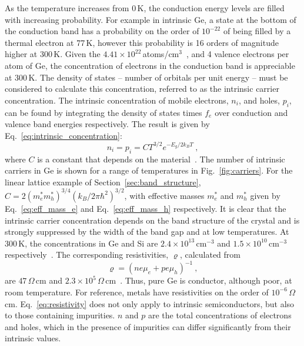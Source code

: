 As the temperature increases from 0\,K, the conduction energy levels are filled with increasing probability. For example in intrinsic Ge, a state at the bottom of the conduction band has a probability on the order of $10^{-22}$ of being filled by a thermal electron at 77\,K, however this probability is 16 orders of magnitude higher at 300\,K. Given the $4.41\times10^{22}$\,atoms/cm$^3$~\cite{knoll}, and 4 valence electrons per atom of Ge, the concentration of electrons in the conduction band is appreciable at 300\,K. The density of states -- number of orbitals per unit energy -- must be considered to calculate this concentration, referred to as the intrinsic carrier concentration. The intrinsic concentration of mobile electrons, $n_i$, and holes, $p_i$, can be found by integrating the density of states times $f_e$ over conduction and valence band energies respectively. The result is given by Eq.~\ref{eq:intrinsic_concentration}:
\begin{equation}
	n_i = p_i = CT^{3/2}e^{-E_g/2k_BT}~,
	\label{eq:intrinsic_concentration}
\end{equation}
where $C$ is a constant that depends on the material~\cite{knoll, kittel}. The number of intrinsic carriers in Ge is shown for a range of temperatures in Fig.~\ref{fig:carriers}. For the linear lattice example of Section~\ref{sec:band_structure}, $C = 2(m_e^*m_h^*)^{3/4}(k_B/2\pi\hbar^2)^{3/2}$, with effective masses $m_e^*$ and $m_h^*$ given by Eq.~\ref{eq:eff_mass_e} and Eq.~\ref{eq:eff_mass_h} respectively. It is clear that the intrinsic carrier concentration depends on the band structure of the crystal and is strongly suppressed by the width of the band gap and at low temperatures. At 300\,K, the concentrations in Ge and Si are $2.4\times10^{13}$\,cm$^{-3}$ and $1.5\times10^{10}$\,cm$^{-3}$ respectively~\cite{knoll}. The corresponding resistivities, $\varrho$, calculated from
\begin{equation}
	\varrho = (ne\mu_e + pe\mu_h)^{-1}~,
	\label{eq:resistivity}
\end{equation}
are $47\,\Omega$\,cm and $2.3\times10^{5}\,\Omega$\,cm~\cite{knoll}. Thus, pure Ge is conductor, although poor, at room temperature. For reference, metals have resistivities  on the order of $10^{-6}\,\Omega$\,cm.  Eq.~\ref{eq:resistivity} does not only apply to intrinsic semiconductors, but also to those containing impurities. $n$ and $p$ are the total concentrations of electrons and holes, which in the presence of impurities can differ significantly from their intrinsic values. 

